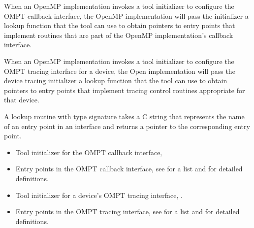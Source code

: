 \begin{comment}
When an OpenMP runtime implementation is initialized for a device,
if a tool callback to initialize tracing for devices has been provided
to the OpenMP implementation by \code{ompt\_tool}, 
it will be invoked on the host. The OpenMP implementation will pass the
tool's device tracing initializer callback a lookup routine that the tool
can use to obtain pointers to runtime entry points that implement
tracing control routines appropriate for that device. 

If a tool callback to initialize monitoring using the OMPT callback
interface has been provided to the OpenMP implementation by
\code{ompt\_tool} and it is invoked on a device,
the initializer will be passed a lookup function to   
obtain pointers to runtime entry points that implement
routines used by the OpenMP implementation's callback interface.
\end{comment}

When an OpenMP implementation invokes a tool initializer to configure
the OMPT callback interface, the OpenMP implementation will pass the
initializer a lookup function that the tool can use to obtain 
pointers to entry points that implement routines that are part of 
the OpenMP implementation's callback interface.

When an OpenMP implementation invokes a tool initializer to configure
the OMPT tracing interface for a device, the Open implementation will
pass the device tracing initializer a lookup function that the tool
can use to obtain pointers to entry points that implement
tracing control routines appropriate for that device. 

\constraints
A lookup routine with type
signature  takes a C string
that represents the name of an entry point in an interface
and returns a pointer to the corresponding entry point.

\crossreferences
\begin{itemize}
\item Tool initializer for the OMPT callback interface, 
\item Entry points in the OMPT callback interface, see
   for a list and
   for detailed definitions.
\item Tool initializer for a device's OMPT tracing interface, .
\item Entry points in the OMPT tracing interface, see
   for a list and
   for detailed definitions.
\end{itemize}

